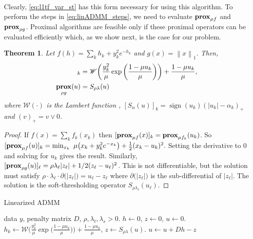 \documentclass{article}
\newtheorem{theorem}{Theorem}%
\newcommand{\norm}[1]{\left\lVert #1 \right\rVert}
\DeclareMathOperator*{\prox}{\bf prox}
\DeclareMathOperator*{\sign}{sign}
\begin{document}
Clearly, \eqref{eq:l1tf_var_st} has this form necessary for using this algorithm.
To perform the steps in \eqref{eq:linADMM_steps}, we need to evaluate
$\prox_{\mu f}$ and $\prox_{\rho g}$. Proximal
algorithms are feasible only if these proximal operators can be
evaluated efficiently which, as we show next, is the case for our
problem.  


\begin{theorem}
  Let $f(h) = \sum_{k} h_{k} + y_{k}^2e^{-h_{k}}$ and $g(x) =
  \norm{x}_1$. Then, 
  \begin{align}
    [\prox_{\mu f}(u)]_k &= \mathscr{W}\bigg(\frac{y_k^2}{\mu}
    \exp\bigg(\frac{1-\mu u_k}{\mu}\bigg) \bigg) + \frac{1-\mu u_k}{\mu},\\
    \prox_{\rho g}(u) &= S_{\rho\lambda}(u)
  \end{align}
where $\mathscr{W}(\cdot)$ is the \textit{Lambert function} \cite{corless_lambertw_1996},  $[S_{\alpha}(u)]_k = \sign(u_k)(|u_k| -\alpha_k)_+$ and
$(v)_+=v\vee 0$.
\end{theorem}
\begin{proof}
  If $f(x)=\sum_k f_k(x_k)$ then $[\prox_{\mu f}(x)]_k =
  \prox_{\mu f_k}(u_k)$. So 
  $[\prox_{\mu f}(u)]_k=\min_{x_k} \,\,
  \mu\big(x_k+y_{k}^2e^{-x_{k}}\big)+\frac{1}{2}  (x_k-u_k)^2.$
  Setting the derivative to 0 and solving for $u_k$ gives the
  result. Similarly, $[\prox_{\rho g}(u)]_\ell=\rho
  \lambda_\ell |z_\ell|+1/2(z_\ell-u_\ell)^2$. This is not differentiable,
  but the solution must satisfy $\rho \cdot \lambda_\ell \cdot \partial
  \big(|z_\ell| \big)=u_\ell-z_\ell$ where $\partial \big(|z_\ell| \big)$ is the
  sub-differential of $|z_\ell|$. The solution is the soft-thresholding
  operator $S_{\rho\lambda_\ell}(u_\ell)$.
\end{proof}

\begin{algorithm}[tb]
  \caption{Linearized ADMM }
  \label{alg:linADMM}
  \begin{algorithmic}
     data $y$, penalty matrix $D$,
    $\rho,\lambda_t,\lambda_s >0$.
     $h\leftarrow 0$, $z\leftarrow 0$, $u\leftarrow 0$. 
    \STATE $h_k\leftarrow \mathscr{W}\bigg(\frac{y_k^2}{\mu}
    \exp\bigg(\frac{1-\mu u_k}{\mu}\bigg) \bigg) + \frac{1-\mu u_k}{\mu}$,
    \STATE $z\leftarrow S_{\rho\lambda}(u)$.
    \STATE $u\leftarrow u + Dh-z$
    \ENDFOR
  \end{algorithmic}
\end{algorithm}
\end{document}
